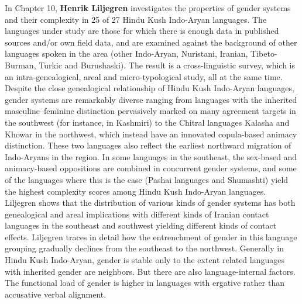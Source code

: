 \documentclass[output=collectionpaper]{langsci/langscibook}
\begin{document}
In Chapter 10, \textbf{Henrik Liljegren} investigates the properties of gender systems and their complexity in 25 of 27 Hindu Kush Indo-Aryan languages. The languages under study are those for which there is enough data in published sources and/or own field data, and are examined against the background of other languages spoken in the area (other Indo-Aryan, Nuristani, Iranian, Tibeto-Burman, Turkic and Burushaski). The result is a cross-linguistic survey, which is an intra-genealogical, areal and micro-typological study, all at the same time. Despite the close genealogical relationship of Hindu Kush Indo-Aryan languages, gender systems are remarkably diverse ranging from languages with the inherited masculine–feminine distinction pervasively marked on many agreement targets in the southwest (for instance, in Kashmiri) to the Chitral languages Kalasha and Khowar in the northwest, which instead have an innovated copula-based animacy distinction. These two languages also reflect the earliest northward migration of Indo-Aryans in the region. In some languages in the southeast, the sex-based and animacy-based oppositions are combined in concurrent gender systems, and some of the languages where this is the case (Pashai languages and Shumashti) yield the highest complexity scores among Hindu Kush Indo-Aryan languages. Liljegren shows that the distribution of various kinds of gender systems has both genealogical and areal implications with different kinds of Iranian contact languages in the southeast and southwest yielding different kinds of contact effects. Liljegren traces in detail how the entrenchment of gender in this language grouping gradually declines from the southeast to the northwest. Generally in Hindu Kush Indo-Aryan, gender is stable only to the extent related languages with inherited gender are neighbors. But there are also language-internal factors. The functional load of gender is higher in languages with ergative rather than accusative verbal alignment.
\end{document}
